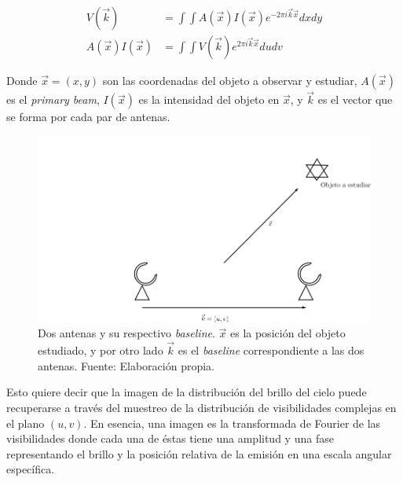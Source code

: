 \begin{align}
V(\vec{k}) &= \int\int A(\vec{x})I(\vec{x})e^{-2\pi i\vec{k}\vec{x}}dxdy \\
A(\vec{x})I(\vec{x}) &= \int\int V(\vec{k})e^{2\pi i\vec{k}\vec{x}}dudv
\end{align}

Donde $\vec{x} = (x,y)$ son las coordenadas del objeto a observar y estudiar, $A(\vec{x})$ es el \textit{primary beam}, $I(\vec{x})$ es la intensidad del objeto en $\vec{x}$, y $\vec{k}$ es el vector que se forma por cada par de antenas. 

\begin{figure}[h!]
\centering
\includegraphics[scale=0.4]{images/antenas.png}
\caption{Dos antenas y su respectivo \textit{baseline}. $\vec{x}$ es la posición del objeto estudiado, y por otro lado $\vec{k}$ es el \textit{baseline} correspondiente a las dos antenas. Fuente: Elaboración propia.}
\label{fig:antena}
\end{figure}

Esto quiere decir que la imagen de la distribución del brillo del cielo puede recuperarse a través del muestreo de la distribución de visibilidades complejas en el plano $(u,v)$. En esencia, una imagen es la transformada de Fourier de las visibilidades donde cada una de éstas tiene una amplitud y una fase representando el brillo y la posición relativa de la emisión en una escala angular específica.


